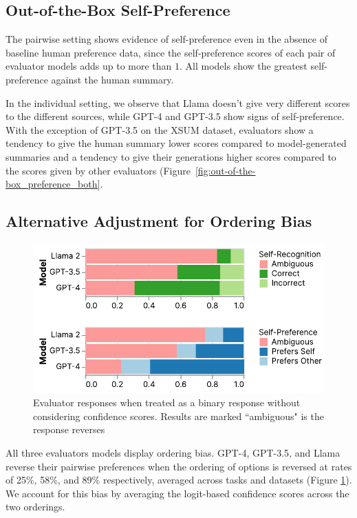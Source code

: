 \documentclass{article}
\theoremstyle{plain}
\theoremstyle{definition}
\theoremstyle{remark}
\begin{document}
\subsection{Out-of-the-Box Self-Preference}



The pairwise setting shows evidence of self-preference even in the absence of baseline human preference data, since the self-preference scores of each pair of evaluator models adds up to more than $1$. All models show the greatest self-preference against the human summary.

In the individual setting, we observe that Llama doesn't give very different scores to the different sources, while GPT-4 and GPT-3.5 show signs of self-preference. With the exception of GPT-3.5 on the XSUM dataset, evaluators show a tendency to give the human summary lower scores compared to model-generated summaries and a tendency to give their generations higher scores compared to the scores given by other evaluators (Figure~\ref{fig:out-of-the-box_preference_both}.

\subsection{Alternative Adjustment for Ordering Bias}

\begin{figure} \centering
\includegraphics[width=\columnwidth]{images/ambiguity_breakdown.pdf}
\caption{Evaluator responses when treated as a binary response without considering confidence scores. Results are marked ``ambiguous" is the response reverses }
\label{fig:ambiguity_breakdown}
\end{figure}

All three evaluators models display ordering bias. GPT-4, GPT-3.5, and Llama reverse their pairwise preferences when the ordering of options is reversed at rates of 25\%, 58\%, and 89\% respectively, averaged across tasks and datasets (Figure \ref{fig:ambiguity_breakdown}). We account for this bias by averaging the logit-based confidence scores across the two orderings.
\end{document}
